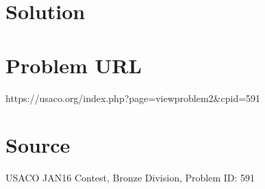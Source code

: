 \documentclass[12pt]{article}
\begin{document}
\section*{Solution}


\section*{Problem URL}
https://usaco.org/index.php?page=viewproblem2&cpid=591

\section*{Source}
USACO JAN16 Contest, Bronze Division, Problem ID: 591
\end{document}
